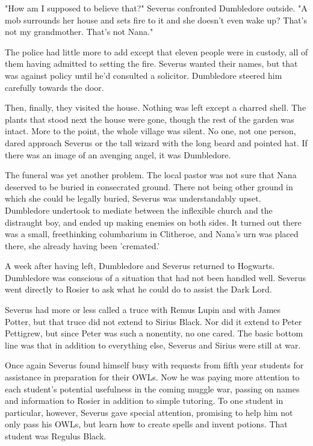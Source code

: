 \documentclass[a4paper,11pt]{article}
\begin{document}
"How am I supposed to believe that?" Severus confronted Dumbledore outside. "A mob surrounds her house and sets fire to it and she doesn't even wake up? That's not my grandmother. That's not Nana."

The police had little more to add except that eleven people were in custody, all of them having admitted to setting the fire. Severus wanted their names, but that was against policy until he'd consulted a solicitor. Dumbledore steered him carefully towards the door.

Then, finally, they visited the house. Nothing was left except a charred shell. The plants that stood next the house were gone, though the rest of the garden was intact. More to the point, the whole village was silent. No one, not one person, dared approach Severus or the tall wizard with the long beard and pointed hat. If there was an image of an avenging angel, it was Dumbledore.

The funeral was yet another problem. The local pastor was not sure that Nana deserved to be buried in consecrated ground. There not being other ground in which she could be legally buried, Severus was understandably upset. Dumbledore undertook to mediate between the inflexible church and the distraught boy, and ended up making enemies on both sides. It turned out there was a small, freethinking columbarium in Clitheroe, and Nana's urn was placed there, she already having been 'cremated.'

A week after having left, Dumbledore and Severus returned to Hogwarts. Dumbledore was conscious of a situation that had not been handled well. Severus went directly to Rosier to ask what he could do to assist the Dark Lord.

Severus had more or less called a truce with Remus Lupin and with James Potter, but that truce did not extend to Sirius Black. Nor did it extend to Peter Pettigrew, but since Peter was such a nonentity, no one cared. The basic bottom line was that in addition to everything else, Severus and Sirius were still at war.

Once again Severus found himself busy with requests from fifth year students for assistance in preparation for their OWLs. Now he was paying more attention to each student's potential usefulness in the coming muggle war, passing on names and information to Rosier in addition to simple tutoring. To one student in particular, however, Severus gave special attention, promising to help him not only pass his OWLs, but learn how to create spells and invent potions. That student was Regulus Black.
\end{document}
